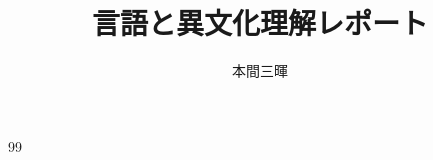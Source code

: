 \documentclass[titlepage,a4paper]{jsarticle}
\title{言語と異文化理解レポート}
\author{本間三暉}
\begin{document}
\maketitle

\begin{thebibliography}{99}
\bibitem{}
\end{thebibliography}
\end{document}
